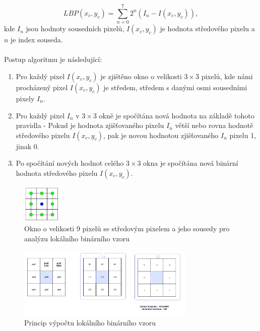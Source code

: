 $$LBP(x_c,y_c) = \sum_{n=0}^{7}2^n(I_n-I(x_c,y_c)),$$
kde $I_n$ jsou hodnoty sousedních pixelů, $I(x_c,y_c)$ je hodnota středového pixelu a $n$ je index souseda. \cite{GaikwadStudy}\\\\
Postup algoritmu je následující:\\
\begin{enumerate}
    \item Pro každý pixel $I(x_c,y_c)$ je zjištěno okno o velikosti $3\times3$ pixelů, kde námi procházený pixel $I(x_c,y_c)$ je středem, středem s danými osmi sousedními pixely $I_n$.
    \item Pro každý pixel $I_n$ v $3\times3$ okně je spočítána nová hodnota na základě tohoto pravidla - Pokud je hodnota zjišťovaného pixelu $I_n$ větší nebo rovna hodnotě středového pixelu $I(x_c,y_c)$, pak je novou hodnotou zjišťovaného $I_n$ pixelu 1, jinak 0.
    \item Po spočítání nových hodnot celého $3\times3$ okna je spočítána nová binární hodnota středového pixelu $I(x_c,y_c)$.
\end{enumerate}

\begin{figure}[!htbp]
    \centering
    \includegraphics[width=70px]{obrazky-figures/lbpn.png}
    \caption{Okno o velikosti 9 pixelů se středovým pixelem a jeho sousedy pro analýzu lokálního binárního vzoru \cite{GragnanielloStudy}}
\end{figure}

\begin{figure}[!htbp]
    \centering
    \includegraphics[width=320px]{obrazky-figures/lbpprincip.png}
    \caption{Princip výpočtu lokálního binárního vzoru}
\end{figure}

